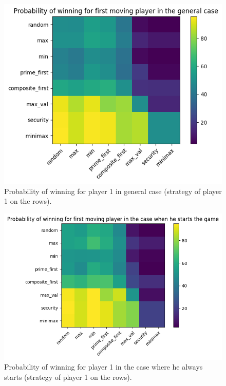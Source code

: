 \begin{figure}
    \centering
    \includegraphics[width=1\linewidth]{img/prob_winning_general.png}
    \caption{Probability of winning for player 1 in general case (strategy of player 1 on the rows).}
    \label{fig:prob_general}
\end{figure}

\begin{figure}
    \centering
    \includegraphics[width=1\linewidth]{img/prob_winning_starts.png}
    \caption{Probability of winning for player 1 in the case where he always starts (strategy of player 1 on the rows).}
    \label{fig:prob_starts}
\end{figure}


